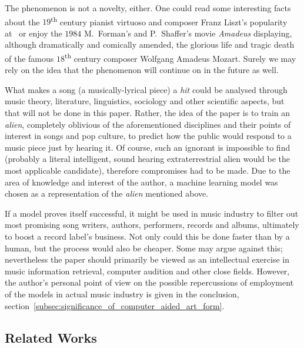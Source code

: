 \documentclass[conference, a4paper, 12pt]{IEEEtran}
\begin{document}
    \par

    The phenomenon is not a novelty, either. One could read some interesting facts about the $ 19 $\textsuperscript{th} century pianist virtuoso and composer \foreignlanguage{german}{Franz Liszt}'s popularity at~\cite{bib:Vincent2019} or enjoy the $ 1984 $ M.\ Forman's and P.\ Shaffer's movie \emph{Amadeus} displaying, although dramatically and comically amended, the glorious life and tragic death of the famous $ 18 $\textsuperscript{th} century composer \foreignlanguage{german}{Wolfgang Amadeus Mozart}. Surely we may rely on the idea that the phenomenon will continue on in the future as well.

    \par

    What makes a song (a musically-lyrical piece) a \emph{hit} could be analysed through music theory, literature, linguistics, sociology and other scientific aspects, but that will not be done in this paper. Rather, the idea of the paper is to train an \emph{alien}, completely oblivious of the aforementioned disciplines and their points of interest in songs and pop culture, to predict how the public would respond to a music piece just by hearing it. Of course, such an ignorant is impossible to find (probably a literal intelligent, sound hearing extraterrestrial alien would be the most applicable candidate), therefore compromises had to be made. Due to the area of knowledge and interest of the author, a machine learning model was chosen as a representation of the \emph{alien} mentioned above.

    \par

    If a model proves itself successful, it might be used in music industry to filter out most promising song writers, authors, performers, records and albums, ultimately to boost a record label's business. Not only could this be done faster than by a human, but the process would also be cheaper. Some may argue against this; nevertheless the paper should primarily be viewed as an intellectual exercise in music information retrieval, computer audition and other close fields. However, the author's personal point of view on the possible repercussions of employment of the models in actual music industry is given in the conclusion, section~\ref{subsec:significance_of_computer_aided_art_form}.

    \par

    \subsection{Related Works}
    \label{subsec:related_works}
\end{document}
